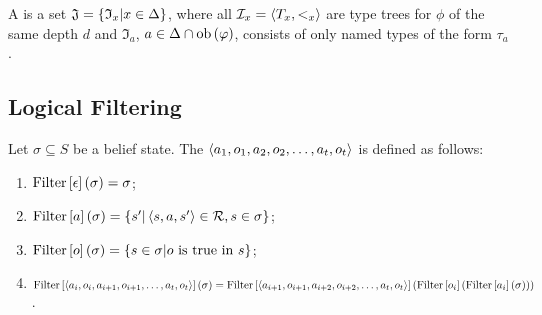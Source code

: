 \begin{defi}
A  is a set $\mathfrak{J}=\left\{ \mathfrak{I}_x|x\in\Delta\right\}$, where all $\mathcal{I}_x=\left\langle T_x,<_x\right\rangle$ are type trees for $\phi$ of the same depth $d$ and $\mathfrak{I}_a$, \feTx{} $a\in\Delta\cap\mbox{ob}\left(\varphi\right)$, consists of only named types of the form $\tau_a$.
\cite{conf/ijcai/WolterZ99}
\end{defi}


\subsection{Logical Filtering}

\begin{defi}
Let $\sigma\subseteq S$ be a belief state. The  $\left\langle a_1,o_1,a_2,o_2,\ldots,a_t,o_t\right\rangle$ is defined as follows:
\begin{enumerate}
 \item $\mbox{Filter}\left[ \epsilon\right]\left(\sigma\right)=\sigma$;
 \item $\mbox{Filter}\left[ a\right]\left(\sigma\right)=\left\{ s'|\left\langle s,a,s'\right\rangle\in\mathcal{R},s\in\sigma\right\}$;
 \item $\mbox{Filter}\left[ o\right]\left(\sigma\right)=\left\{ s\in\sigma|o\mbox{ is true in }s\right\}$;
 \item $\mbox{Filter}\left[ \left\langle a_i,o_i,a_{i+1},o_{i+1},\ldots,a_t,o_t\right\rangle\right]\left(\sigma\right)=\mbox{Filter}\left[ \left\langle a_{i+1},o_{i+1},a_{i+2},o_{i+2},\ldots,a_t,o_t\right\rangle\right]\left(\mbox{Filter}\left[ o_i\right]\left(\mbox{Filter}\left[ a_i\right]\left(\sigma\right)\right)\right)$.
\end{enumerate}
\cite{conf/ijcai/AmirR03}
\end{defi}


